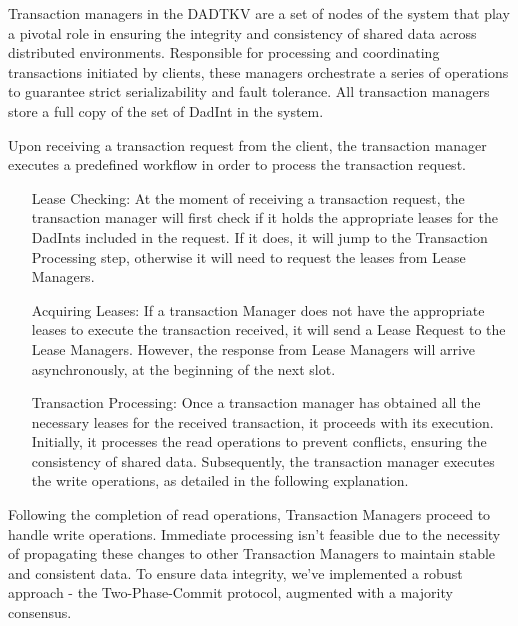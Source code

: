 \documentclass[times, 10pt,twocolumn]{article}
\begin{document}

Transaction managers in the DADTKV are a set of nodes of the 
system that play a pivotal role in ensuring the integrity and 
consistency of shared data across distributed environments. 
Responsible for processing and coordinating transactions initiated 
by clients, these managers orchestrate a series of operations to 
guarantee strict serializability and fault tolerance. All 
transaction managers store a full copy of the set of DadInt in 
the system.

Upon receiving a transaction request from the client, the 
transaction manager executes a predefined workflow in order 
to process the transaction request.

\begin{enumerate}[label=\textbf{Step \arabic*:}, left=0pt, align=left, itemsep=0.5em]
    \item[Lease Checking:]
    At the moment of receiving a transaction request, the 
    transaction manager will first check if it holds the appropriate 
    leases for the DadInts included in the request. If it does, 
    it will jump to the Transaction Processing step, otherwise it 
    will need to request the leases from Lease Managers.
    
    \item[Acquiring Leases:]
    If a transaction Manager does not have the appropriate leases 
    to execute the transaction received, it will send a Lease 
    Request to the Lease Managers. However, the response from 
    Lease Managers will arrive asynchronously, at the beginning 
    of the next slot.
    
    \item[Transaction Processing:]
    Once a transaction manager has obtained all the necessary 
    leases for the received transaction, it proceeds with its 
    execution. Initially, it processes the read operations to 
    prevent conflicts, ensuring the consistency of shared data. 
    Subsequently, the transaction manager executes the write operations, 
    as detailed in the following explanation.
\end{enumerate}

Following the completion of read operations, Transaction Managers 
proceed to handle write operations. Immediate processing isn't 
feasible due to the necessity of propagating these changes to 
other Transaction Managers to maintain stable and consistent data. 
To ensure data integrity, we've implemented a robust approach - 
the Two-Phase-Commit protocol, augmented with a majority consensus.
\end{document}
